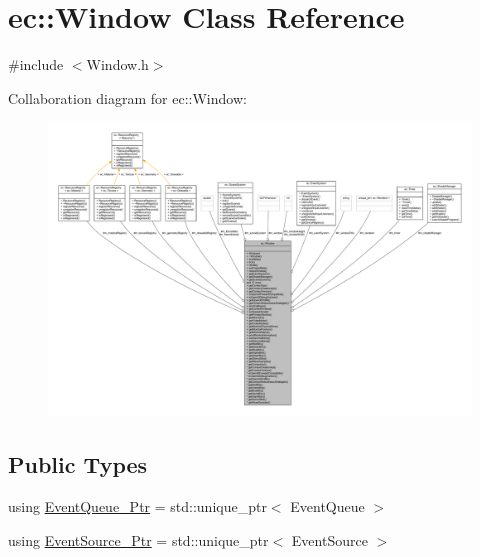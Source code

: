 \hypertarget{classec_1_1_window}{}\section{ec\+:\+:Window Class Reference}
\label{classec_1_1_window}


{\ttfamily \#include $<$Window.\+h$>$}



Collaboration diagram for ec\+:\+:Window\+:\nopagebreak
\begin{figure}[H]
\begin{center}
\leavevmode
\includegraphics[width=350pt]{classec_1_1_window__coll__graph}
\end{center}
\end{figure}
\subsection*{Public Types}
\begin{DoxyCompactItemize}
\item 
using \mbox{\hyperlink{classec_1_1_window_afe0927efdedc84c345120ae15bf6994a}{Event\+Queue\+\_\+\+Ptr}} = std\+::unique\+\_\+ptr$<$ Event\+Queue $>$
\item 
using \mbox{\hyperlink{classec_1_1_window_ae7501526590ece55dbe92ea496e62738}{Event\+Source\+\_\+\+Ptr}} = std\+::unique\+\_\+ptr$<$ Event\+Source $>$
\end{DoxyCompactItemize}
